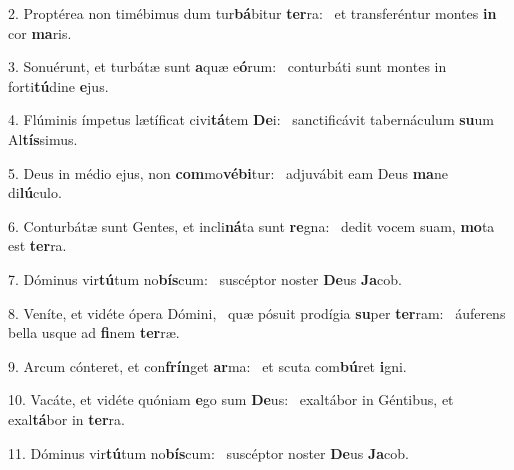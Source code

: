 2. Proptérea non timébimus dum tur\textbf{bá}bitur \textbf{ter}ra: \ast\  et transferéntur montes \textbf{in} cor \textbf{ma}ris.\

3. Sonuérunt, et turbátæ sunt \textbf{a}quæ e\textbf{ó}rum: \ast\  conturbáti sunt montes in forti\textbf{tú}dine \textbf{e}jus.\

4. Flúminis ímpetus lætíficat civi\textbf{tá}tem \textbf{De}i: \ast\  sanctificávit tabernáculum \textbf{su}um Al\textbf{tís}simus.\

5. Deus in médio ejus, non \textbf{com}mo\textbf{vé}\textbf{bi}tur: \ast\  adjuvábit eam Deus \textbf{ma}ne di\textbf{lú}culo.\

6. Conturbátæ sunt Gentes, et incli\textbf{ná}ta sunt \textbf{re}gna: \ast\  dedit vocem suam, \textbf{mo}ta est \textbf{ter}ra.\

7. Dóminus vir\textbf{tú}tum no\textbf{bís}cum: \ast\  suscéptor noster \textbf{De}us \textbf{Ja}cob.\

8. Veníte, et vidéte ópera Dómini, \dag\  quæ pósuit prodígia \textbf{su}per \textbf{ter}ram: \ast\  áuferens bella usque ad \textbf{fi}nem \textbf{ter}ræ.\

9. Arcum cónteret, et con\textbf{frín}get \textbf{ar}ma: \ast\  et scuta com\textbf{bú}ret \textbf{i}gni.\

10. Vacáte, et vidéte quóniam \textbf{e}go sum \textbf{De}us: \ast\  exaltábor in Géntibus, et exal\textbf{tá}bor in \textbf{ter}ra.\

11. Dóminus vir\textbf{tú}tum no\textbf{bís}cum: \ast\  suscéptor noster \textbf{De}us \textbf{Ja}cob.\

